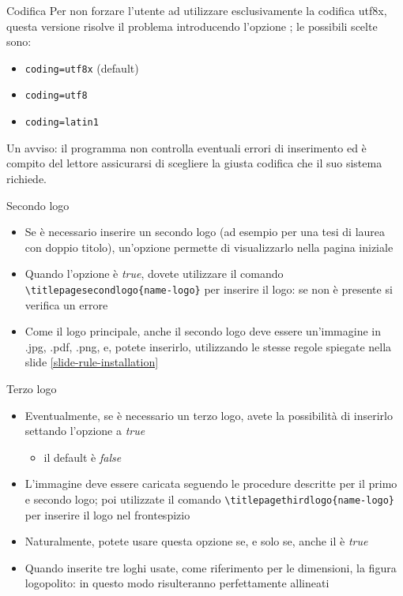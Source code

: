 \begin{frame}[t,fragile]{Codifica}
Per non forzare l'utente ad utilizzare esclusivamente la codifica utf8x, questa versione risolve il problema introducendo l'opzione ; le possibili scelte sono:
\begin{itemize}
\item \verb!coding=utf8x! (default)
\item \verb!coding=utf8!
\item \verb!coding=latin1!
\end{itemize}
Un avviso: il programma non controlla eventuali errori di inserimento ed è compito del lettore assicurarsi di scegliere la giusta codifica che il suo sistema richiede.
\end{frame}

\begin{frame}[t,fragile]{Secondo logo}
\begin{itemize}
\item Se è necessario inserire un secondo logo (ad esempio per una tesi di laurea con doppio titolo), un'opzione permette di visualizzarlo nella pagina iniziale
\item Quando l'opzione  è \emph{true}, dovete utilizzare il comando \verb!\titlepagesecondlogo{name-logo}! per inserire il logo: se non è presente si verifica un errore
\item Come il logo principale, anche il secondo logo deve essere un'immagine in .jpg, .pdf, .png, e, potete inserirlo, utilizzando le stesse regole spiegate nella slide \ref{slide-rule-installation}
\end{itemize}
\end{frame}

\begin{frame}[fragile]{Terzo logo}
\begin{itemize}
\item Eventualmente, se è necessario un terzo logo, avete la possibilità di inserirlo settando l'opzione  a \emph{true}
\begin{itemize}
\item il default è \emph{false}
\end{itemize}
\item L'immagine deve essere caricata seguendo le procedure descritte per il primo e secondo logo; poi utilizzate il comando \verb!\titlepagethirdlogo{name-logo}! per inserire il logo nel frontespizio
\item Naturalmente, potete usare questa opzione se, e solo se, anche il  è \emph{true}
\item Quando inserite tre loghi usate, come riferimento per le dimensioni, la figura \alert{logopolito}: in questo modo risulteranno perfettamente allineati
\end{itemize}
\end{frame}

